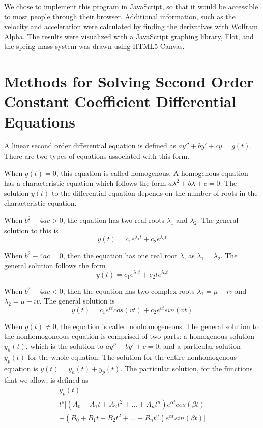 \documentclass[11pt]{article} %
\begin{document}
\begin{multicols}{2}
We chose to implement this program in JavaScript, so that it would be accessible to most people through their browser. Additional information, such as the velocity and acceleration were calculated by finding the derivatives with Wolfram Alpha. The results were visualized with a JavaScript graphing library, Flot, and the spring-mass system was drawn using HTML5 Canvas.

\section {Methods for Solving Second Order Constant Coefficient Differential Equations}

A linear second order differential equation is defined as $ay'' + by' + cy = g(t)$. There are two types of equations associated with this form.

When $g(t) = 0$, this equation is called homogenous. A homogenous equation has a characteristic equation which follows the form $a\lambda^2 + b\lambda + c = 0$. The solution $y(t)$ to the differential equation depends on the number of roots in the characteristic equation.

When $b^2 - 4ac > 0$, the equation has two real roots $\lambda_1$ and $\lambda_2$. The general solution to this is
\begin{equation}\label{eq:two_real_roots}
y(t) = c_1e^{\lambda_1t} + c_2e^{\lambda_2t}
\end{equation}

When $b^2 - 4ac = 0$, then the equation has one real root $\lambda$, as $\lambda_1 = \lambda_2$. The general solution follows the form
\begin{equation}\label{eq:one_real_root}
y(t) = c_1e^{{\lambda_1}t} + c_2te^{{\lambda_2}t}
\end{equation}

When $b^2 - 4ac < 0$, then the equation has two complex roots $\lambda_1 = \mu + iv$ and $\lambda_2 = \mu - iv$. The general solution is 
\begin{equation}\label{eq:two_complex_roots}
y(t) = c_1e^{vt}cos(vt) + c_2e^{vt}sin(vt)
\end{equation}

When $g(t) \neq 0$, the equation is called nonhomogeneous. The general solution to the nonhomogoneous equation is comprised of two parts: a homogenous solution $y_h(t)$, which is the solution to $ay'' + by' + c = 0$, and a particular solution $y_p(t)$ for the whole equation. The solution for the entire nonhomogenous equation is $y(t) = y_h(t) + y_p(t)$. The particular solution, for the functions that we allow, is defined as
\begin{equation}\label{eq:generalized}
\begin{split}
y_p(t)=\\t^s[(A_0 + A_1t + A_2t^2 + ... + A_nt^n)e^{{\alpha}t}cos({\beta}t)\\+ (B_0 + B_1t + B_2t^2 + ... + B_nt^n)e^{{\alpha}t}sin({\beta}t)]
\end{split}
\end{equation}


\end{multicols}
\end{document}
